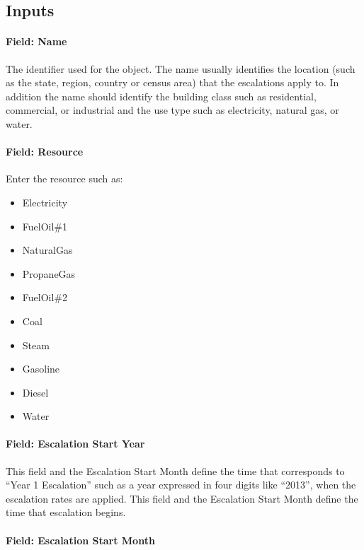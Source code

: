 \subsection{Inputs}\label{inputs-061}

\paragraph{Field: Name}\label{field-name-059}

The identifier used for the object. The name usually identifies the location (such as the state, region, country or census area) that the escalations apply to. In addition the name should identify the building class such as residential, commercial, or industrial and the use type such as electricity, natural gas, or water.

\paragraph{Field: Resource}\label{field-resource-000}

Enter the resource such as:

\begin{itemize}
\item
  Electricity
\item
  FuelOil\#1
\item
  NaturalGas
\item
  PropaneGas
\item
  FuelOil\#2
\item
  Coal
\item
  Steam
\item
  Gasoline
\item
  Diesel
\item
  Water
\end{itemize}

\paragraph{Field: Escalation Start Year}\label{field-escalation-start-year}

This field and the Escalation Start Month define the time that corresponds to ``Year 1 Escalation'' such as a year expressed in four digits like ``2013'', when the escalation rates are applied. This field and the Escalation Start Month define the time that escalation begins.

\paragraph{Field: Escalation Start Month}\label{field-escalation-start-month}

